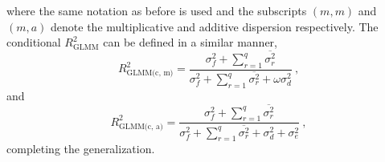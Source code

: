 where the same notation as before is used and the subscripts $(m, m)$ and $(m, a)$ denote the multiplicative and additive dispersion respectively.
The conditional $R^2_{\text{GLMM}}$ can be defined in a similar manner,
\begin{equation}
    \label{eq:R2_GLMM_c_m}
    R^2_{\text{GLMM(c, m)}} = \frac{\sigma^2_f + \sum_{r=1}^{q}\overline{\sigma^2_{r}}}{\sigma^2_f + \sum_{r=1}^{q}\overline{\sigma^2_{r}} + \omega \sigma^2_{d}}\ ,
\end{equation}
and
\begin{equation}
    \label{eq:R2_GLMM_c_a}
    R^2_{\text{GLMM(c, a)}} = \frac{\sigma^2_f + \sum_{r=1}^{q}\overline{\sigma^2_{r}}}{\sigma^2_f + \sum_{r=1}^{q}\overline{\sigma^2_{r}} + \sigma^2_{d} + \sigma^2_{e}}\ ,
\end{equation}
completing the generalization. 







